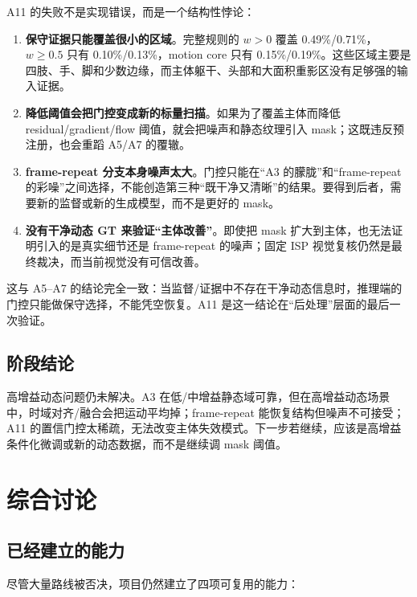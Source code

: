 \documentclass[11pt,a4paper,UTF8,fontset=fandol]{ctexart}
\begin{document}
A11 的失败不是实现错误，而是一个结构性悖论：

\begin{enumerate}
  \item \textbf{保守证据只能覆盖很小的区域}。完整规则的 $w>0$ 覆盖 0.49\%/0.71\%，$w\ge0.5$ 只有 0.10\%/0.13\%，motion core 只有 0.15\%/0.19\%。这些区域主要是四肢、手、脚和少数边缘，而主体躯干、头部和大面积重影区没有足够强的输入证据。
  \item \textbf{降低阈值会把门控变成新的标量扫描}。如果为了覆盖主体而降低 residual/gradient/flow 阈值，就会把噪声和静态纹理引入 mask；这既违反预注册，也会重蹈 A5/A7 的覆辙。
  \item \textbf{frame-repeat 分支本身噪声太大}。门控只能在“A3 的朦胧”和“frame-repeat 的彩噪”之间选择，不能创造第三种“既干净又清晰”的结果。要得到后者，需要新的监督或新的生成模型，而不是更好的 mask。
  \item \textbf{没有干净动态 GT 来验证“主体改善”}。即使把 mask 扩大到主体，也无法证明引入的是真实细节还是 frame-repeat 的噪声；固定 ISP 视觉复核仍然是最终裁决，而当前视觉没有可信改善。
\end{enumerate}

这与 A5--A7 的结论完全一致：当监督/证据中不存在干净动态信息时，推理端的门控只能做保守选择，不能凭空恢复。A11 是这一结论在“后处理”层面的最后一次验证。

\subsection{阶段结论}

高增益动态问题仍未解决。A3 在低/中增益静态域可靠，但在高增益动态场景中，时域对齐/融合会把运动平均掉；frame-repeat 能恢复结构但噪声不可接受；A11 的置信门控太稀疏，无法改变主体失效模式。下一步若继续，应该是高增益条件化微调或新的动态数据，而不是继续调 mask 阈值。

\section{综合讨论}

\subsection{已经建立的能力}

尽管大量路线被否决，项目仍然建立了四项可复用的能力：
\end{document}
